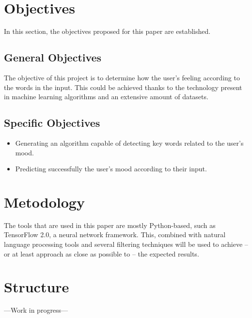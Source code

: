 \section{Objectives}
In this section, the objectives proposed for this paper are established.

\subsection{General Objectives}
The objective of this project is to determine how the user's feeling according to the words in the input. This could be achieved thanks to the technology present in machine learning algorithms and an extensive amount of datasets.

\subsection{Specific Objectives}
\begin{itemize}
	\item Generating an algorithm capable of detecting key words related to the user's mood.
	\item Predicting successfully the user's mood according to their input.
\end{itemize}

\section{Metodology}
The tools that are used in this paper are mostly Python-based, such as TensorFlow 2.0, a neural network framework. This, combined with natural language processing tools and several filtering techniques will be used to achieve -- or at least approach as close as possible to -- the expected results.

\section{Structure}
---Work in progress---
\clearpage